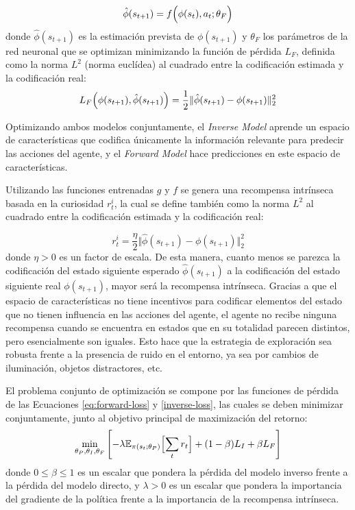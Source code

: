 \begin{enumerate}
\begin{equation}
        \hat{\phi}(s_{t+1}) = f\Bigl(\phi(s_t), a_t;\theta_F\Bigr)
    \end{equation} donde $\hat{\phi}(s_{t+1})$ es la estimación prevista de $\phi(s_{t+1})$ y $\theta_F$ los parámetros de la red neuronal que se optimizan minimizando la función de pérdida $L_F$, definida como la norma $L^2$ (norma euclídea) al cuadrado entre la codificación estimada y la codificación real:
    \begin{equation}
        L_F\Bigl(\phi(s_{t+1}), \hat{\phi}(s_{t+1})\Bigr) = \frac{1}{2}\Vert\hat{\phi}(s_{t+1}) - \phi(s_{t+1})\Vert_{2}^{2}
        \label{eq:forward-loss}
    \end{equation}
\end{enumerate}

Optimizando ambos modelos conjuntamente, el \emph{Inverse Model} aprende un espacio de características que codifica únicamente la información relevante para predecir las acciones del agente, y el \emph{Forward Model} hace predicciones en este espacio de características.

Utilizando las funciones entrenadas $g$ y $f$ se genera una recompensa intrínseca basada en la curiosidad $r_t^i$, la cual se define también como la norma $L^2$ al cuadrado entre la codificación estimada y la codificación real:

\begin{equation}
    r_t^i = \frac{\eta}{2}\Vert \hat{\phi}(s_{t+1})-\phi(s_{t+1})\Vert_2^2
\end{equation}
donde $\eta > 0$ es un factor de escala. De esta manera, cuanto menos se parezca la codificación del estado siguiente esperado $\hat{\phi}(s_{t+1})$ a la codificación del estado siguiente real $\phi(s_{t+1})$, mayor será la recompensa intrínseca. Gracias a que el espacio de características no tiene incentivos para codificar elementos del estado que no tienen influencia en las acciones del agente, el agente no recibe ninguna recompensa cuando se encuentra en estados que en su totalidad parecen distintos, pero esencialmente son iguales. Esto hace que la estrategia de exploración sea robusta frente a la presencia de ruido en el entorno, ya sea por cambios de iluminación, objetos distractores, etc.

El problema conjunto de optimización se compone por las funciones de pérdida de las Ecuaciones \ref{eq:forward-loss} y \ref{inverse-loss}, las cuales se deben minimizar conjuntamente, junto al objetivo principal de maximización del retorno:
\begin{equation}
    \min_{\theta_P, \theta_I, \theta_F} \left[- \lambda\mathbb{E}_{\pi(s_t;\theta_P)}\Bigl[\sum_t r_t\Bigr]+(1-\beta)L_I+\beta L_F \right]
\end{equation}
donde $0 \leq \beta \leq 1$ es un escalar que pondera la pérdida del modelo inverso frente a la pérdida del modelo directo, y $\lambda > 0$ es un escalar que pondera la importancia del gradiente de la política frente a la importancia de la recompensa intrínseca.

